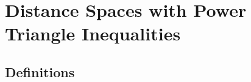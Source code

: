 ﻿%

\chapter{Distance Spaces with Power Triangle Inequalities}
\label{chp:trirel}
\label{chp:pdspace}
\label{app:trirel}
\label{app:pds}
\section{Definitions}
\label{sec:pdspace_def}
%


